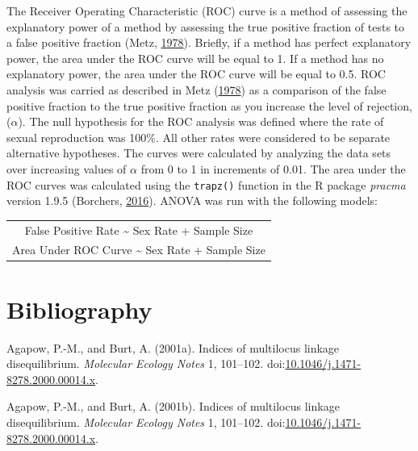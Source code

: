 \documentclass[double,12pt]{beavtex}
\begin{document}
  The Receiver Operating Characteristic (ROC) curve is a method of
  assessing the explanatory power of a method by assessing the true
  positive fraction of tests to a false positive fraction (Metz,
  \protect\hyperlink{ref-metz1978basic}{1978}). Briefly, if a method has
  perfect explanatory power, the area under the ROC curve will be equal to
  1. If a method has no explanatory power, the area under the ROC curve
  will be equal to 0.5. ROC analysis was carried as described in Metz
  (\protect\hyperlink{ref-metz1978basic}{1978}) as a comparison of the
  false positive fraction to the true positive fraction as you increase
  the level of rejection, (\(\alpha\)). The null hypothesis for the ROC
  analysis was defined where the rate of sexual reproduction was 100\%.
  All other rates were considered to be separate alternative hypotheses.
  The curves were calculated by analyzing the data sets over increasing
  values of \(\alpha\) from 0 to 1 in increments of 0.01. The area under
  the ROC curves was calculated using the \texttt{trapz()} function in the
  R package \emph{pracma} version 1.9.5 (Borchers,
  \protect\hyperlink{ref-borchers2016pracma}{2016}). ANOVA was run with
  the following models:
  
  \begin{longtable}[]{@{}c@{}}
  \toprule
  False Positive Rate \textasciitilde{} Sex Rate + Sample
  Size\tabularnewline
  Area Under ROC Curve \textasciitilde{} Sex Rate + Sample
  Size\tabularnewline
  \bottomrule
  \end{longtable}
  
  \backmatter
  
  \chapter{Bibliography}\label{bibliography}
  
  \noindent
  
  \setlength{\parindent}{-0.20in} \setlength{\leftskip}{0.20in}
  \setlength{\parskip}{8pt} \singlespacing
  
  \hypertarget{refs}{}
  \hypertarget{ref-Agapow_2001}{}
  Agapow, P.-M., and Burt, A. (2001a). Indices of multilocus linkage
  disequilibrium. \emph{Molecular Ecology Notes} 1, 101--102.
  doi:\href{https://doi.org/10.1046/j.1471-8278.2000.00014.x}{10.1046/j.1471-8278.2000.00014.x}.
  
  \hypertarget{ref-Agapow:2001}{}
  Agapow, P.-M., and Burt, A. (2001b). Indices of multilocus linkage
  disequilibrium. \emph{Molecular Ecology Notes} 1, 101--102.
  doi:\href{https://doi.org/10.1046/j.1471-8278.2000.00014.x}{10.1046/j.1471-8278.2000.00014.x}.
  
\end{document}
